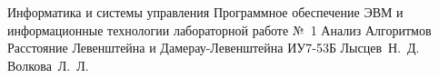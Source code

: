 \documentclass{bmstu}
\begin{document}
\makereporttitle
{Информатика и системы управления} %
{Программное обеспечение ЭВМ и информационные технологии}
{лабораторной работе №~1} %
{Анализ Алгоритмов} %
{Расстояние Левенштейна и Дамерау-Левенштейна} %
{} %
{ИУ7-53Б} %
{Лысцев~Н.~Д.} %
{Волкова~Л.~Л.}

\maketableofcontents








\makebibliography
\end{document}
